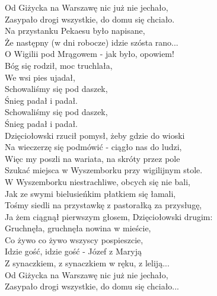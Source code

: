 
\begin{flushleft}
Od Giżycka na Warszawę nic już nie jechało,  \tab{} \\
Zasypało drogi wszystkie, do domu się chciało. \\
Na przystanku Pekaesu było napisane, \tab{}\\
Że następny (w dni robocze) idzie szósta rano... \\
\vskip 3mm
O Wigilii pod Mrągowem - jak było, opowiem!  \\
Bóg się rodził, moc truchlała, \tab{}\tab{}\\
We wsi pies ujadał, \tab{}\tab{}\\
Schowaliśmy się pod daszek, \tab{}\tab{}\\
Śnieg padał i padał. \tab{}\tab{}\\
Schowaliśmy się pod daszek, \tab{}\tab{}\\
Śnieg padał i padał. \tab{}\tab{}\\
\vskip 3mm
Dzięciołowski rzucił pomysł, żeby gdzie do wioski \\
Na wieczerzę się podmówić - ciągło nas do ludzi, \\
Więc my poszli na wariata, na skróty przez pole \\
Szukać miejsca w Wyszemborku przy wigilijnym stole. \\
\vskip 3mm
W Wyszemborku niestrachliwe, obcych się nie bali, \\
Jak ze swymi bielusieńkim płatkiem się łamali, \\
Tośmy siedli na przystawkę z pastorałką za przysługę, \\
Ja żem ciągnął pierwszym głosem, Dzięciołowski drugim: \\
\vskip 3mm
Gruchnęła, gruchnęła nowina w mieście, \tab{}\\
Co żywo co żywo wszyscy pospieszcie, \tab{}\\
Idzie gość, idzie gość - Józef z Maryją \tab{}\\
Z synaczkiem, z synaczkiem w ręku, z leliją... \tab{}\\
\vskip 3mm
Od Giżycka na Warszawę nic już nie jechało, \\
Zasypało drogi wszystkie, do domu się chciało... \\
\end{flushleft}
\clearpage
